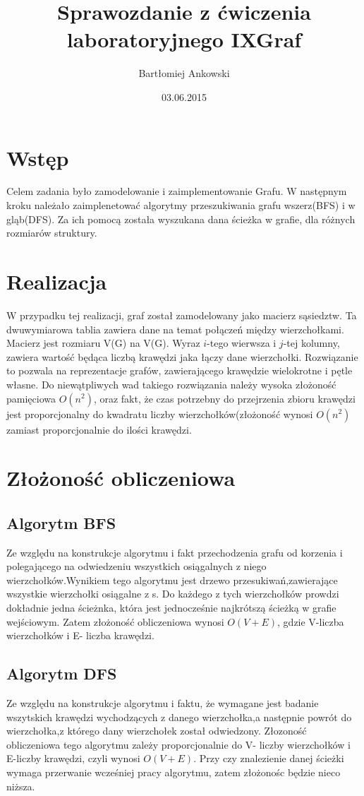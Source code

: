 \documentclass[12pt,a4paper,titlepage]{article}
\title{Sprawozdanie z ćwiczenia laboratoryjnego IX\newline Graf}
\date{03.06.2015}
\author{Bartłomiej Ankowski}
\begin{document}
\maketitle
\pagestyle{empty}
\tableofcontents
\section{Wstęp}
Celem zadania było zamodelowanie i zaimplementowanie Grafu. 
W następnym kroku należało zaimplenetować algorytmy przeszukiwania grafu wszerz(BFS) i w gląb(DFS).
Za ich pomocą została wyszukana dana ścieżka w grafie, dla różnych rozmiarów struktury. 
\section{Realizacja}
W przypadku tej realizacji, graf został zamodelowany jako macierz sąsiedztw.
Ta dwuwymiarowa tablia zawiera dane na temat połączeń między wierzchołkami.
Macierz jest rozmiaru V(G) na V(G). Wyraz $i$-tego wierwsza i $j$-tej kolumny,
zawiera wartość będąca liczbą krawędzi jaka łączy dane wierzchołki.
Rozwiązanie to pozwala na reprezentacje grafów, zawierającego krawędzie wielokrotne i pętle własne.
Do niewątpliwych wad takiego rozwiązania należy wysoka złożoność pamięciowa $O(n^2)$, oraz fakt, że czas potrzebny do przejrzenia zbioru krawędzi jest proporcjonalny do kwadratu liczby wierzchołków(złożoność wynosi $O(n^2)$ zamiast proporcjonalnie do ilości krawędzi.
\section{Złożoność obliczeniowa}
\subsection{Algorytm BFS}
Ze względu na konstrukcje algorytmu i fakt przechodzenia grafu od korzenia i polegającego na odwiedzeniu wszystkich osiągalnych z niego wierzchołków.Wynikiem tego algorytmu jest drzewo przesukiwań,zawierające wszystkie wierzchołki osiągalne z s. Do każdego z tych wierzchołków prowdzi dokładnie jedna ścieżnka, która jest jednocześnie najkrótszą ścieżką w grafie wejściowym.
Zatem złożoność obliczeniowa wynosi $O(V+E)$, gdzie V-liczba wierzchołków i E- liczba krawędzi.
\subsection{Algorytm DFS}
Ze względu na konstrukcje algorytmu i faktu, że wymagane jest badanie wszytskich krawędzi wychodzących z danego wierzchołka,a następnie powrót do wierzchołka,z którego dany wierzchołek został odwiedzony.
Złozoność obliczeniowa tego algorytmu zależy proporcjonalnie do V- liczby wierzchołków i E-liczby krawędzi, czyli wynosi $O(V+E)$.
Przy czy znalezienie danej ścieżki wymaga przerwanie wcześniej pracy algorytmu, zatem złożonośc będzie nieco niższa.
\end{document}

